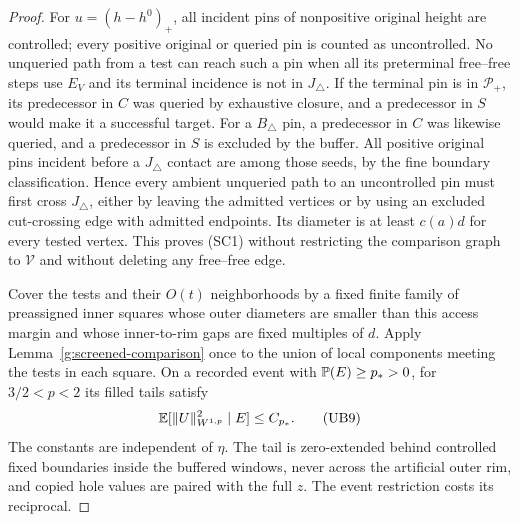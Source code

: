 \begin{proof}
For \(u=(h-h^0)_+\), all incident pins of nonpositive original height
are controlled; every positive original or queried pin is counted as
uncontrolled.  No unqueried path from a test can reach such a pin
when all its preterminal free--free steps use \(E_V\) and its terminal
incidence is not in \(J_\triangle\).  If the terminal pin is in
\(\mathcal P_+\), its predecessor in \(C\) was queried by exhaustive
closure, and a predecessor in \(S\) would make it a successful target.
For a \(B_\triangle\) pin, a predecessor in \(C\) was likewise queried,
and a predecessor in \(S\) is excluded by the buffer.  All positive
original pins incident before a \(J_\triangle\) contact are among
those seeds, by the fine boundary classification.  Hence every
ambient unqueried path to an uncontrolled pin must first cross
\(J_\triangle\), either by leaving the admitted vertices or by using
an excluded cut-crossing edge with admitted endpoints.  Its diameter
is at least \(c(a)d\) for every tested vertex.  This proves (SC1)
without restricting the comparison graph to \(\mathcal V\) and
without deleting any free--free edge.

Cover the tests and their \(O(t)\) neighborhoods by a fixed finite
family of preassigned inner squares whose outer diameters are smaller
than this access margin and whose inner-to-rim gaps are fixed multiples
of \(d\).  Apply Lemma~\ref{g:screened-comparison} once to the union
of local components meeting the tests in each square.  On a recorded
event with \(\mathbb P(E)\ge p_*>0\), for \(3/2<p<2\) its filled tails
satisfy
\[
             \mathbb E[\|U\|_{W^{1,p}}^2\mid E]\le C_{p_*}.            \tag{UB9}
\]
The constants are independent of \(\eta\).  The tail is zero-extended
behind controlled fixed boundaries inside the buffered windows, never
across the artificial outer rim, and copied hole values are paired
with the full \(z\).  The event restriction costs its reciprocal.


\end{proof}
